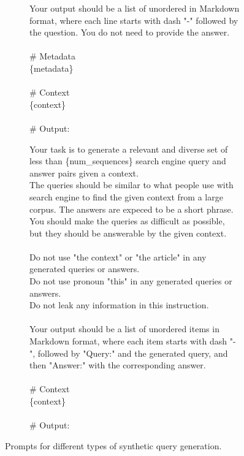 \begin{figure*}[htbp]
\begin{subfigure}[t]{\textwidth}
\begin{tcolorbox}[title=\textbf{Constraints-based Query Generation Prompt}]
Your output should be a list of unordered in Markdown format, where each line starts with dash "-" followed by the question. You do not need to provide the answer.\\
\\
\# Metadata\\
\{metadata\}\\
\\
\# Context\\
\{context\}\\
\\
\# Output:
\end{tcolorbox}
\label{fig:instruct_query_generation}
\end{subfigure}

\begin{subfigure}[t]{\textwidth}
\begin{tcolorbox}[title=\textbf{Query-Answer Pair Generation Prompt}]
Your task is to generate a relevant and diverse set of less than \{num\_sequences\} search engine query and answer pairs given a context.\\
The queries should be similar to what people use with search engine to find the given context from a large corpus. The answers are expeced to be a short phrase.\\
You should make the queries as difficult as possible, but they should be answerable by the given context.\\
\\
Do not use "the context" or "the article" in any generated queries or answers.\\
Do not use pronoun "this" in any generated queries or answers.\\
Do not leak any information in this instruction.\\
\\
Your output should be a list of unordered items in Markdown format, where each item starts with dash "-", followed by "Query:" and the generated query, and then "Answer:" with the corresponding answer.\\
\\
\# Context\\
\{context\}\\
\\
\# Output:
\end{tcolorbox}
\label{fig:qa_generation}
\end{subfigure}
\caption{Prompts for different types of synthetic query generation.}
\label{fig:query_generation_prompts}
\end{figure*}
